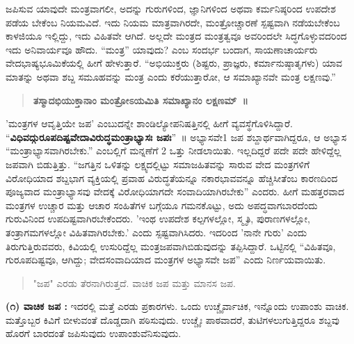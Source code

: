 {ಜಪಿಸುವ ಯಾವುದೇ ಮಂತ್ರವಾಗಲೀ, ಅದನ್ನು ಗುರುಗಳಿಂದ, ಜ್ಞಾನಿಗಳಿಂದ ಅಥವಾ ಕರ್ಮನಿಷ್ಠರಿಂದ ಉಪದೇಶ ಪಡೆಯ ಬೇಕೆಂಬ ನಿಯಮವಿದೆ. ಇದು ನಿಯಮ ಮಾತ್ರವಾಗಿರದೇ, ಮಂತ್ರೋಚ್ಚಾರಣೆ ಸ್ಪಷ್ಟವಾಗಿ ನಡೆಯಬೇಕೆಂಬ ಕಾಳಜಿಯೂ ಇಲ್ಲಿದ್ದು, ಇದು ವಿಹಿತವೇ ಆಗಿದೆ. ಅಲ್ಲದೇ ಮಂತ್ರದ ಮಂತ್ರತ್ವವೂ ಅವರಿಂದಲೇ ಸಿದ್ಧಗೊಳ್ಳುವದರಿಂದ ಇದು ಅನಿವಾರ್ಯವೂ ಹೌದು. “ಮಂತ್ರ” ಯಾವುದು? ಎಂಬ ಸಂದರ್ಭ ಬಂದಾಗ, ಸಾಯಣಾಚಾರ್ಯರು ವೇದಭಾಷ್ಯಭೂಮಿಕೆಯಲ್ಲಿ ಹೀಗೆ ಹೇಳುತ್ತಾರೆ. “ಅಭಿಯುಕ್ತರು (ಶಿಷ್ಟರು, ಪ್ರಾಜ್ಞರು, ಕರ್ಮಾನುಷ್ಠಾತೃಗಳು) ಯಾವ ಮಾತನ್ನು ಅಥವಾ ಶಬ್ದ ಸಮೂಹವನ್ನು ಮಂತ್ರ ಎಂದು ಕರೆಯುತ್ತಾರೋ, ಆ ಸಮಾಖ್ಯಾನವೇ ಮಂತ್ರ ಲಕ್ಷಣವು.” 
\begin{verse}
\textbf{ತಸ್ಮಾದಭಿಯುಕ್ತಾನಾಂ ಮಂತ್ರೋಽಯಮಿತಿ ಸಮಾಖ್ಯಾನಂ ಲಕ್ಷಣಮ್~॥}
\end{verse}
’ಮಂತ್ರಗಳ ಆವೃತ್ತಿಯೇ ಜಪ’ ಎಂಬುದನ್ನೇ ಶಾಂಡಿಲ್ಯೋಪನಿಷತ್ತಿನಲ್ಲಿ ಹೀಗೆ ವ್ಯವಸ್ಥೆಗೊಳಿಸಿದ್ದಾರೆ. “\textbf{ವಿಧಿವದ್ಗು\-ರೂಪದಿಷ್ಟವೇದಾವಿರುದ್ಧಮಂತ್ರಾಭ್ಯಾಸಃ ಜಪಃ}”~॥ ಅಭ್ಯಾಸವೇ1 ಜಪ ಶಬ್ದಾರ್ಥವಾಗಿದ್ದರೂ, ಆ ಅಭ್ಯಾಸ “ಮಂತ್ರಾಭ್ಯಾಸವಾಗಿರಬೇಕು.” ಎಂಬಲ್ಲಿಗೆ ಮನ್ನಣೆಗೆ 2 ಒತ್ತು ನೀಡಲಾಯಿತು. ಇಲ್ಲದಿದ್ದರೆ ಪದೇ ಪದೇ ಹೇಳಿದ್ದೆಲ್ಲ ಜಪವಾಗಿ ಬಿಡುತ್ತಿತ್ತು. “ಜಗತ್ತಿನ ಒಳಿತನ್ನು ಲಕ್ಷ್ಯದಲ್ಲಿಟ್ಟು ಸಮಾಜಹಿತವನ್ನು ಸಾರುವ ವೇದ ಮಂತ್ರಗಳಿಗೆ ವಿರೋಧಿಯಾದ ಶಬ್ದಭಾಗ ವ್ಯಕ್ತಿಯಲ್ಲಿ ಪ್ರವಾಹ ವಿರುದ್ಧತೆಯನ್ನೂ ನಕಾರಭಾವವನ್ನೂ ಹೆಚ್ಚಿಸೀತೆಂಬ ಕಾರಣದಿಂದ ಪೂಜ್ಯವಾದ ಮಂತ್ರಾಭ್ಯಾಸವು ವೇದಕ್ಕೆ ವಿರೋಧಿಯಾಗದೇ ಸಂವಾದಿಯಾಗಿರಬೇಕು” ಎಂದರು. ಹೀಗೆ ಮಹತ್ತರವಾದ ಮಂತ್ರಗಳ ಉಚ್ಚಾರ ಮತ್ತು ಆಚಾರ ಸಂಹಿತೆಗಳ ಬಗ್ಗೆಯೂ ಗಮನಕೊಟ್ಟು, ಅದು ಅಪದ್ಧವಾಗಬಾರದೆಂದು ಗುರುವಿನಿಂದ ಉಪದಿಷ್ಟವಾಗಿರಬೇಕೆಂದರು. ’ಇಂಥ ಉಪದೇಶ ಕಲ್ಪಗಳಲ್ಲೋ, ಸ್ಮೃತಿ, ಪುರಾಣಗಳಲ್ಲೋ, ತಂತ್ರಾಗಮಗಳಲ್ಲೋ ವಿಹಿತವಾಗಿರಬೇಕು.’ ಎಂದು ಸ್ಪಷ್ಟವಾಗಿಸಿದರು. ಇದರಿಂದ ’ನಾನೇ ಗುರು’ ಎಂದು ತಿರುಗುತ್ತಿರುವವರು, ಕಿವಿಯಲ್ಲಿ ಉಸುರಿದ್ದೆಲ್ಲ ಮಂತ್ರಜಪವಾಗಿಬಿಡುವುದನ್ನು ತಪ್ಪಿಸಿದ್ದಾರೆ. ಒಟ್ಟಿನಲ್ಲಿ “ವಿಹಿತವೂ, ಗುರೂಪದಿಷ್ಟವೂ, ಆಗಿದ್ದು; ವೇದಸಂವಾದಿಯಾದ ಮಂತ್ರಗಳ ಅಭ್ಯಾಸವೇ ಜಪ” ಎಂದು ನಿರ್ಣಯವಾಯಿತು.
\begin{verse}
"ಜಪ" ಎರಡು ತೆರನಾಗಿರುತ್ತದೆ. ವಾಚಿಕ ಜಪ ಮತ್ತು ಮಾನಸ ಜಪ.
\end{verse}
\textbf{(೧) ವಾಚಿಕ ಜಪ :} ಇದರಲ್ಲಿ ಮತ್ತೆ ಎರಡು ಪ್ರಕಾರಗಳು. ಒಂದು ಉಚ್ಚೈರ್ವಾಚಿಕ, ಇನ್ನೊಂದು ಉಪಾಂಶು ವಾಚಿಕ. ಮತ್ತೊಬ್ಬರ ಕಿವಿಗೆ ಬೀಳುವಂತೆ ದೊಡ್ಡದಾಗಿ ಪಠಿಸುವುದು. ಉಚ್ಚೈಃ ಪಾಠವಾದರೆ, ತುಟಿಗಳಲುಗುತ್ತಿದ್ದರೂ ಶಬ್ದವು ಹೊರಗೆ ಬಾರದಂತೆ ಜಪಿಸುವುದು ಉಪಾಂಶುವೆನಿಸುವುದು.

}
